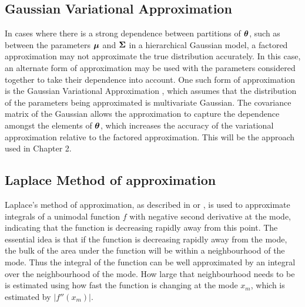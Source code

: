 
\subsection{Gaussian Variational Approximation}

In cases where there is a strong dependence between partitions of ${\boldsymbol \theta}$,
such as between the parameters ${\boldsymbol \mu}$ and ${\boldsymbol \Sigma}$ in a hierarchical Gaussian
model, a factored approximation may not approximate the true distribution
accurately. In this case, an alternate form of approximation may be used with
the parameters considered together to take their dependence into account. One
such form of approximation is the Gaussian Variational Approximation
\cite{Ormerod2012}, which assumes that the distribution of the parameters being
approximated is multivariate Gaussian. The covariance matrix of the Gaussian
allows the approximation to capture the dependence amongst the elements of
${\boldsymbol \theta}$, which increases the accuracy of the variational approximation
relative to the factored approximation. This will be the approach used in
Chapter 2.

\subsection{Laplace Method of approximation}
\label{sec:laplace_approximation}

Laplace's method of approximation, as described in \cite{butler_2007} or
\cite{MacKay:2002:ITI:971143}, is used to approximate integrals of a unimodal
function $f$ with negative second derivative at the mode, indicating that the
function is decreasing rapidly away from this point. The essential idea is that
if the function is decreasing rapidly away from the mode, the bulk of the area
under the function will be within a neighbourhood of the mode. Thus the integral
of the function can be well approximated by an integral over the neighbourhood
of the mode. How large that neighbourhood needs to be is estimated using how
fast the function is changing at the mode $x_m$, which is estimated by
$|f''(x_m)|$.

